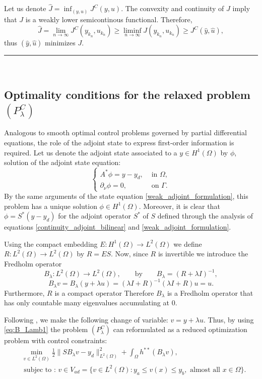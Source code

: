 \documentclass[11pt,a4paper]{amsart}
\newcommand{\kw}{\rule{2mm}{2mm}}
\newcommand{\om}{\Omega}
\renewenvironment{proof}{{Proof.}}{\hfill\kw}
\newcommand{\norm}[1]{\lVert #1 \rVert}
\begin{document}
\begin{proof}
Let us denote $\hat{J}=\inf_{(y,u)} J^{C}(y,u)$. The convexity and continuity of $J$ imply that $J$ is a weakly lower semicontinous functional. Therefore,
       \[
       \hat{J}=\lim_{n\to \infty}J^{C}(y_{k_n},u_{k_n})\ge \liminf_{n\to \infty}J(y_{k_n},u_{k_n})\ge J^{C}(\hat{y},\hat{u}),
       \]
       thus $(\hat{y},\hat{u})$ minimizes $J$. %
   \end{proof}\\

\subsection{Optimality conditions for the relaxed problem $(P^C_\lambda)$}
Analogous to smooth optimal control problems governed by partial differential equations, the role of the adjoint state to express first-order information is required. Let us denote the adjoint state associated to a $y \in H^1(\om)$  by $\phi$, solution of the adjoint state equation:
\[
\begin{cases}
A^* {\phi}=y-y_d, &\mbox{ in }\Omega,\\
\partial_{\nu} \phi=0, &\mbox{ on }\Gamma.
\end{cases}
\]
By the same arguments of the state equation \eqref{weak_adjoint_formulation}, this problem has a unique solution $\phi \in H^1(\om)$. Moreover, it is clear that $\phi=S^*(y-y_d)$ for the adjoint operator $S^*$ of $S$ defined through the analysis of equations \eqref{continuity_adjoint_bilinear} and \eqref{weak_adjoint_formulation}.

Using the compact embedding $E:H^1(\Omega) \to L^2(\Omega)$ we define $R: L^2(\om) \to  L^2(\om)$ by $R=ES$. Now, since  $R$ is invertible we introduce the Fredholm operator  
$$B_{\lambda}:L^{2}(\om)\to L^{2}(\om), \qquad \text{by} \qquad B_\lambda =(R+ \lambda I)^{-1},$$ 
\begin{equation} \label{eq:B_Lamb1}   
B_{\lambda}v=B_{\lambda}(y+\lambda u)=(\lambda I+R)^{-1}(\lambda I+R)u=u.
\end{equation}
Furthermore, $R$ is a compact operator Therefore $B_\lambda$ is a Fredholm operator that has only countable many eigenvalues accumulating at $0$. 

Following \cite{meyer1}, we make the following change of variable:  $v=y+\lambda u$. Thus, by using \eqref{eq:B_Lamb1} the problem $(P^C_\lambda)$ can reformulated as a reduced optimization problem with control constraints:
\begin{subequations}\label{eq:reduced}
\begin{align}%
    &\min_{v\in L^2(\Omega)}\frac{1}{2}\norm{SB_{\lambda}v-y_d}_{L^2(\om)}^2+\int_{\om}h^{**}(B_{\lambda}v), \label{eq:reduced_PClamb} \\
    & \text{ subjec to : } v \in V_{ad}=\{v\in L^2(\om): y_a\le v(x)\le y_b, \text{ almost all }x\in \om\} \label{eq:boxconst_PClamb}.
\end{align}
\end{subequations}
\end{document}
